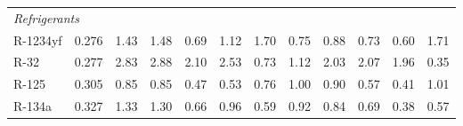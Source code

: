\begin{table}[H]
\begin{tabular}{lccccccccccc}
\multicolumn{15}{l}{\emph{Refrigerants}} \\
R-1234yf & 0.276 & 1.43 & 1.48 & 0.69 & 1.12 & 1.70 & 0.75 & 0.88 & 0.73 & 0.60 & 1.71 \\
R-32 & 0.277 & 2.83 & 2.88 & 2.10 & 2.53 & 0.73 & 1.12 & 2.03 & 2.07 & 1.96 & 0.35 \\
R-125 & 0.305 & 0.85 & 0.85 & 0.47 & 0.53 & 0.76 & 1.00 & 0.90 & 0.57 & 0.41 & 1.01 \\
R-134a & 0.327 & 1.33 & 1.30 & 0.66 & 0.96 & 0.59 & 0.92 & 0.84 & 0.69 & 0.38 & 0.57 \\
\bottomrule
\end{tabular}
\end{table}
